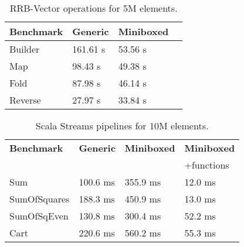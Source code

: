 \begin{table}[t]
  \centering
  \begin{tabularx}{0.48\textwidth}{|g *{3}{|Y}|} \hline
    \textbf{Benchmark} & \textbf{Generic}      & \textbf{Miniboxed} \\  \hline
    Builder            &        161.61 s       &           53.56 s  \\
    Map                &         98.43 s       &           49.38 s  \\
    Fold               &         87.98 s       &           46.14 s  \\
    Reverse            &         27.97 s       &           33.84 s  \\  \hline
  \end{tabularx}
  \vspace{-2mm}
  \caption{RRB-Vector operations for 5M elements.}
  \label{table:pureimage}
  \vspace{-1em}
\end{table}


\begin{table}[t]
  \begin{tabularx}{0.48\textwidth}{|g *{3}{|Y}|} \hline
    \textbf{Benchmark} & \textbf{Generic} & \textbf{Miniboxed}& \textbf{Miniboxed} \\
                       &                  &                   & +functions \\ \hline
    Sum              &              100.6 ms &              355.9 ms &             12.0 ms \\
    SumOfSquares     &              188.3 ms &              450.9 ms &             13.0 ms \\
    SumOfSqEven      &              130.8 ms &              300.4 ms &             52.2 ms \\
    Cart             &              220.6 ms &              560.2 ms &             55.3 ms \\ \hline
  \end{tabularx}
  \vspace{-2mm}
  \caption{Scala Streams pipelines for 10M elements.}
  \label{table:streams}
  \vspace{-1em}
\end{table}

